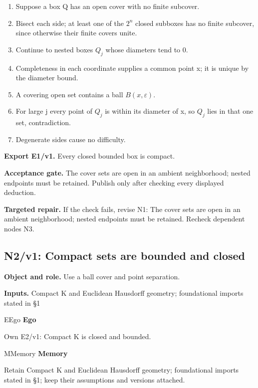 \documentclass[preprint,12pt,aps,pra,showkeys,amsmath,amssymb,superscriptaddress,floatfix]{revtex4-2}
\theoremstyle{definition}
\theoremstyle{remark}
\newcommand{\mmfaculty}[3]{%
 \begin{mmfacultybox}{#1}{#2}
 {\sffamily\bfseries\color{MMBlue}#2}\par\smallskip #3
 \end{mmfacultybox}}
\newcommand{\field}[2]{\par\smallskip\noindent\textbf{#1.} #2\par}
\begin{document}
\begin{enumerate}[label=N1.\arabic*,leftmargin=3.4em]

\item Suppose a box Q has an open cover with no finite subcover.

\item Bisect each side; at least one of the \(2^{n}\) closed subboxes has no
finite subcover, since otherwise their finite covers unite.

\item Continue to nested boxes \(Q_j\) whose diameters tend to 0.

\item Completeness in each coordinate supplies a common point x; it is unique
by the diameter bound.

\item A covering open set contains a ball \(B(x,\varepsilon )\).

\item For large j every point of \(Q_j\) is within its diameter of x, so
\(Q_j\) lies in that one set, contradiction.

\item Degenerate sides cause no difficulty.

\end{enumerate}

\field{Export E1/v1}{Every closed bounded box is compact.}

\field{Acceptance gate}{The cover sets are open in an ambient neighborhood; nested endpoints
must be retained. Publish only after checking every displayed deduction.}

\field{Targeted repair}{If the check fails, revise N1: The cover sets are open in an ambient
neighborhood; nested endpoints must be retained. Recheck dependent nodes
N3.}

\clearpage

\subsection{N2/v1: Compact sets are bounded and closed}

\field{Object and role}{Use a ball cover and point separation.}

\field{Inputs}{Compact K and Euclidean Hausdorff geometry; foundational imports stated
in §1}

\mmfaculty{E}{Ego}{Own E2/v1: Compact K is closed and bounded.}

\mmfaculty{M}{Memory}{Retain Compact K and Euclidean Hausdorff geometry; foundational imports
stated in §1; keep their assumptions and versions attached.}
\end{document}
